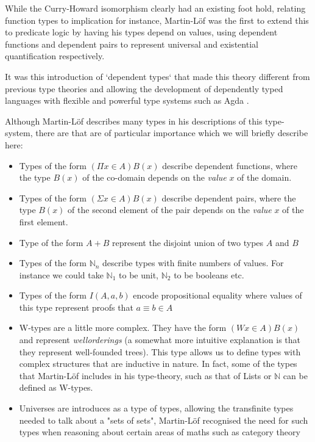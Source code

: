 \documentclass{ProgressReport}[2020/09/15]
\begin{document}
          While the Curry-Howard isomorphism clearly had an existing
          foot hold, relating function types to implication for
          instance, Martin-Löf was the first to extend this to
          predicate logic by having his types depend on values,
          using dependent functions and dependent pairs to represent
          universal and existential quantification respectively.

          It was this introduction of `dependent types` that made this
          theory different from previous type theories and allowing
          the development of dependently typed languages with flexible
          and powerful type systems such as Agda \cite{norell}.

          Although Martin-Löf describes many types in his descriptions
          of this type-system, there are that are of particular
          importance which we will briefly describe here:

          \begin{itemize}
          \item Types of the form $( \Pi x \in A ) B(x)$ describe
            dependent functions, where the type $B(x)$ of the co-domain
            depends on the \emph{value} $x$ of the domain.
          \item Types of the form $( \Sigma x \in A ) B(x)$ describe
            dependent pairs, where the type $B(x)$ of the second
            element of the pair depends on the \emph{value} $x$ of the
            first element.
          \item Type of the form $A + B$ represent the disjoint union
            of two types $A$ and $B$
          \item Types of the form $\mathbb{N}_n$ describe types
            with finite numbers of values. For instance we could take
            $\mathbb{N}_1$ to be unit, $\mathbb{N}_2$ to be booleans
            etc.
          \item Types of the form $I (A , a , b)$ encode propositional
            equality where values of this type represent proofs
            that $a \equiv b \in A$
          \item W-types are a little more complex. They have the form
            $( W x \in A ) B(x)$ and represent \emph{wellorderings} (a
            somewhat more intuitive explanation is that they represent
            well-founded trees). This type allows us to define types
            with complex structures that are inductive in nature. In fact,
            some of the types that Martin-Löf includes in his
            type-theory, such as that of Lists or $\mathbb{N}$ can be
            defined as W-types.
          \item Universes are introduces as a type of types, allowing
            the transfinite types needed to talk about a "sets of
            sets", Martin-Löf recognised the need for such types when
            reasoning about certain areas of maths such as category
            theory \end{itemize}
\end{document}
